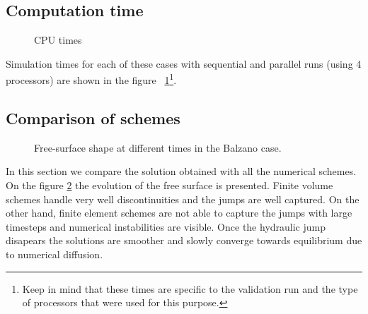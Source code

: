 \subsection{Computation time}

\begin{figure}[H]
  \centering
  \caption{CPU times}\label{fig:balzano:cputime}
\end{figure}

Simulation times for each of these cases with sequential and parallel runs (using 4 processors) are shown in the figure ~\ref{fig:balzano:cputime}\footnote{Keep in mind that these times
are specific to the validation run and the type of processors that were used for this purpose.}.

\subsection{Comparison of schemes}

\begin{figure}[H]
\begin{minipage}[t]{0.5\textwidth}
 \centering
\end{minipage}%
\begin{minipage}[t]{0.5\textwidth}
 \centering
\end{minipage}
\begin{minipage}[t]{0.5\textwidth}
 \centering
\end{minipage}%
\begin{minipage}[t]{0.5\textwidth}
 \centering
\end{minipage}
\begin{minipage}[t]{0.5\textwidth}
 \centering
\end{minipage}%
\begin{minipage}[t]{0.5\textwidth}
 \centering
\end{minipage}
\caption{Free-surface shape at different times in the Balzano case.}
\label{fig:balzano:SL}
\end{figure}

In this section we compare the solution obtained with all the numerical schemes.
On the figure \ref{fig:balzano:SL} the evolution of the free surface is presented.
Finite volume schemes handle very well discontinuities and the jumps are well captured.
On the other hand, finite element schemes are not able to capture the jumps with large timesteps and numerical instabilities
are visible. Once the hydraulic jump disapears the solutions are smoother
and slowly converge towards equilibrium due to numerical diffusion.

